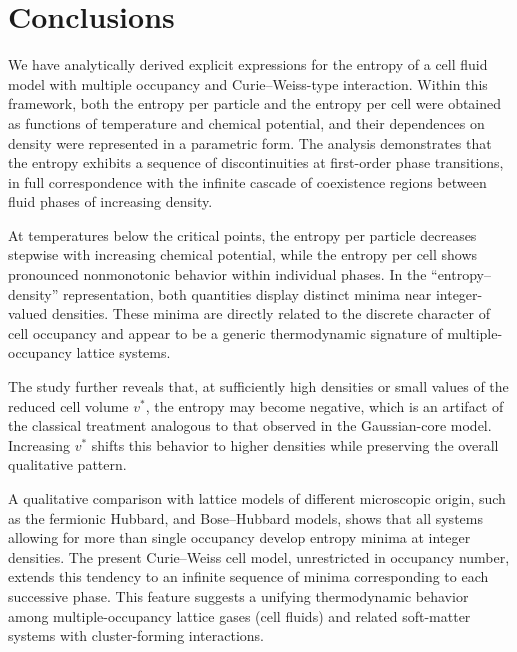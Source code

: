 \documentclass[entropy,article,submit,pdftex,moreauthors]{Definitions/mdpi}
\begin{document}
\section{Conclusions}
\label{sec:conclusions}
We have analytically derived explicit expressions for the entropy of a cell fluid model with multiple occupancy and Curie–Weiss-type interaction. Within this framework, both the entropy per particle and the entropy per cell were obtained as functions of temperature and chemical potential, and their dependences on density were represented in a parametric form. The analysis demonstrates that the entropy exhibits a sequence of discontinuities at first-order phase transitions, in full correspondence with the infinite cascade of coexistence regions between fluid phases of increasing density.

At temperatures below the critical points, the entropy per particle decreases stepwise with increasing chemical potential, while the entropy per cell shows pronounced nonmonotonic behavior within individual phases. In the ``entropy–density'' representation, both quantities display distinct minima near integer-valued densities. These minima are directly related to the discrete character of cell occupancy and appear to be a generic thermodynamic signature of multiple-occupancy lattice systems.

The study further reveals that, at sufficiently high densities or small values of the reduced cell volume $v^*$, the entropy may become negative, which is an artifact of the classical treatment analogous to that observed in the Gaussian-core model. Increasing $v^*$ shifts this behavior to higher densities while preserving the overall qualitative pattern.

A qualitative comparison with lattice models of different microscopic origin, such as the fermionic Hubbard, and Bose–Hubbard models, shows that all systems allowing for more than single occupancy develop entropy minima at integer densities. The present Curie–Weiss cell model, unrestricted in occupancy number, extends this tendency to an infinite sequence of minima corresponding to each successive phase. This feature suggests a unifying thermodynamic behavior among multiple-occupancy lattice gases (cell fluids) and related soft-matter systems with cluster-forming interactions.

\vspace{6pt} 

\authorcontributions{}
\end{document}
